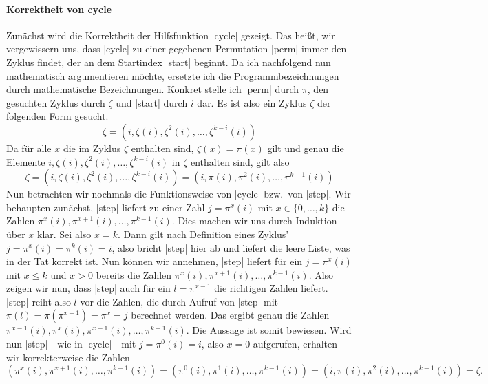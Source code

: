 \paragraph{Korrektheit von cycle}
Zunächst wird die Korrektheit der Hilfsfunktion |cycle| gezeigt.
Das heißt, wir vergewissern uns, dass |cycle| zu einer gegebenen Permutation |perm| immer den Zyklus findet, der an dem Startindex |start| beginnt.
Da ich nachfolgend nun mathematisch argumentieren möchte, ersetzte ich die Programmbezeichnungen durch mathematische Bezeichnungen.
Konkret stelle ich |perm| durch $\pi$, den gesuchten Zyklus durch $\zeta$ und |start| durch $i$ dar.
Es ist also ein Zyklus $\zeta$ der folgenden Form gesucht.
\[ \zeta = (i, \zeta(i),\zeta^2(i), \dots, \zeta^{k-i}(i)) \]
Da für alle $x$ die im Zyklus $\zeta$ enthalten sind, $\zeta(x) = \pi(x)$ gilt und genau die Elemente
\linebreak $i, \zeta(i),\zeta^2(i), \dots, \zeta^{k-i}(i)$ in $\zeta$ enthalten sind, gilt also
\[ \zeta = (i, \zeta(i),\zeta^2(i), \dots, \zeta^{k-i}(i)) = (i, \pi(i),\pi^2(i), \dots, \pi^{k-1}(i)) \]
Nun betrachten wir nochmals die Funktionsweise von |cycle| bzw.\ von |step|.
Wir behaupten zunächst, |step| liefert zu einer Zahl $j = \pi^x(i)$ mit $x \in \{0,\dots,k\}$ die Zahlen $\pi^x(i), \pi^{x+1}(i), \dots, \pi^{k-1}(i)$.
Dies machen wir uns durch Induktion über $x$ klar. Sei also $x = k$.
Dann gilt nach Definition eines Zyklus' $j = \pi^x(i) = \pi^k(i) = i$, also bricht |step| hier ab und liefert die leere Liste, was in der Tat korrekt ist.
Nun können wir annehmen, |step| liefert für ein $j = \pi^x(i)$ mit $x \leq k$ und $x > 0$ bereits die Zahlen $\pi^x(i), \pi^{x+1}(i), \dots, \pi^{k-1}(i)$.
Also zeigen wir nun, dass |step| auch für ein $l = \pi^{x-1}$ die richtigen Zahlen liefert.
|step| reiht also $l$ vor die Zahlen, die durch Aufruf von |step| mit $\pi(l) = \pi(\pi^{x-1}) = \pi^x = j$ berechnet werden.
Das ergibt genau die Zahlen $\pi^{x-1}(i), \pi^x(i), \pi^{x+1}(i), \dots, \pi^{k-1}(i)$.
Die Aussage ist somit bewiesen.
Wird nun |step| - wie in |cycle| - mit $j = \pi^0(i) = i$, also $x = 0$ aufgerufen, erhalten wir korrekterweise die Zahlen
\[ (\pi^x(i), \pi^{x+1}(i), \dots, \pi^{k-1}(i)) = (\pi^0(i), \pi^1(i), \dots, \pi^{k-1}(i)) = (i, \pi(i), \pi^2(i), \dots, \pi^{k-1}(i)) = \zeta.\]
